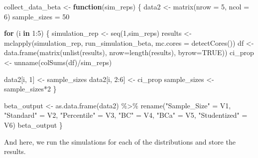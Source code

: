 \documentclass[12pt]{article}
\newenvironment{Shaded}{\begin{snugshade}}{\end{snugshade}}
\newcommand{\AttributeTok}[1]{\textcolor[rgb]{0.77,0.63,0.00}{#1}}
\newcommand{\ConstantTok}[1]{\textcolor[rgb]{0.00,0.00,0.00}{#1}}
\newcommand{\ControlFlowTok}[1]{\textcolor[rgb]{0.13,0.29,0.53}{\textbf{#1}}}
\newcommand{\DecValTok}[1]{\textcolor[rgb]{0.00,0.00,0.81}{#1}}
\newcommand{\FunctionTok}[1]{\textcolor[rgb]{0.00,0.00,0.00}{#1}}
\newcommand{\NormalTok}[1]{#1}
\newcommand{\OtherTok}[1]{\textcolor[rgb]{0.56,0.35,0.01}{#1}}
\newcommand{\SpecialCharTok}[1]{\textcolor[rgb]{0.00,0.00,0.00}{#1}}
\newcommand{\StringTok}[1]{\textcolor[rgb]{0.31,0.60,0.02}{#1}}
\begin{document}
\begin{Shaded}
\begin{Highlighting}[]
\NormalTok{collect\_data\_beta }\OtherTok{\textless{}{-}} \ControlFlowTok{function}\NormalTok{(sim\_reps) \{}
\NormalTok{  data2 }\OtherTok{\textless{}{-}} \FunctionTok{matrix}\NormalTok{(}\AttributeTok{nrow =} \DecValTok{5}\NormalTok{, }\AttributeTok{ncol =} \DecValTok{6}\NormalTok{)}
\NormalTok{  sample\_sizes }\OtherTok{=} \DecValTok{50}
  
  \ControlFlowTok{for}\NormalTok{ (i }\ControlFlowTok{in} \DecValTok{1}\SpecialCharTok{:}\DecValTok{5}\NormalTok{) \{}
\NormalTok{    simulation\_rep }\OtherTok{\textless{}{-}} \FunctionTok{seq}\NormalTok{(}\DecValTok{1}\NormalTok{,sim\_reps)}
\NormalTok{    results }\OtherTok{\textless{}{-}} \FunctionTok{mclapply}\NormalTok{(simulation\_rep, run\_simulation\_beta, }
                        \AttributeTok{mc.cores =} \FunctionTok{detectCores}\NormalTok{())}
\NormalTok{    df }\OtherTok{\textless{}{-}} \FunctionTok{data.frame}\NormalTok{(}\FunctionTok{matrix}\NormalTok{(}\FunctionTok{unlist}\NormalTok{(results), }\AttributeTok{nrow=}\FunctionTok{length}\NormalTok{(results), }\AttributeTok{byrow=}\ConstantTok{TRUE}\NormalTok{))}
\NormalTok{    ci\_prop }\OtherTok{\textless{}{-}} \FunctionTok{unname}\NormalTok{(}\FunctionTok{colSums}\NormalTok{(df)}\SpecialCharTok{/}\NormalTok{sim\_reps)}
    
\NormalTok{    data2[i, }\DecValTok{1}\NormalTok{] }\OtherTok{\textless{}{-}}\NormalTok{ sample\_sizes}
\NormalTok{    data2[i, }\DecValTok{2}\SpecialCharTok{:}\DecValTok{6}\NormalTok{] }\OtherTok{\textless{}{-}}\NormalTok{ ci\_prop}
\NormalTok{    sample\_sizes }\OtherTok{\textless{}{-}}\NormalTok{ sample\_sizes}\SpecialCharTok{*}\DecValTok{2}
\NormalTok{  \}}
  
\NormalTok{  beta\_output }\OtherTok{\textless{}{-}} \FunctionTok{as.data.frame}\NormalTok{(data2) }\SpecialCharTok{\%\textgreater{}\%} 
    \FunctionTok{rename}\NormalTok{(}\StringTok{"Sample\_Size"} \OtherTok{=}\NormalTok{ V1, }\StringTok{"Standard"} \OtherTok{=}\NormalTok{ V2, }\StringTok{"Percentile"} \OtherTok{=}\NormalTok{ V3, }\StringTok{"BC"} \OtherTok{=}\NormalTok{ V4, }
           \StringTok{"BCa"} \OtherTok{=}\NormalTok{ V5, }\StringTok{"Studentized"} \OtherTok{=}\NormalTok{ V6) }
\NormalTok{  beta\_output}
\NormalTok{\}}
\end{Highlighting}
\end{Shaded}

And here, we run the simulations for each of the distributions and store
the results.
\end{document}

